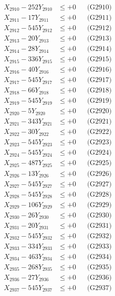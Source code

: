 \documentclass[a4paper,10pt]{article}
\begin{document}
{\begin{align}
X_{2910} - 252Y_{2910} &\leq +0 && \text{(G2910)} \\
\allowbreak
X_{2911} - 17Y_{2911} &\leq +0 && \text{(G2911)} \\
X_{2912} - 545Y_{2912} &\leq +0 && \text{(G2912)} \\
X_{2913} - 20Y_{2913} &\leq +0 && \text{(G2913)} \\
X_{2914} - 28Y_{2914} &\leq +0 && \text{(G2914)} \\
X_{2915} - 336Y_{2915} &\leq +0 && \text{(G2915)} \\
X_{2916} - 40Y_{2916} &\leq +0 && \text{(G2916)} \\
X_{2917} - 545Y_{2917} &\leq +0 && \text{(G2917)} \\
X_{2918} - 66Y_{2918} &\leq +0 && \text{(G2918)} \\
X_{2919} - 545Y_{2919} &\leq +0 && \text{(G2919)} \\
X_{2920} - 5Y_{2920} &\leq +0 && \text{(G2920)} \\
\allowbreak
X_{2921} - 343Y_{2921} &\leq +0 && \text{(G2921)} \\
X_{2922} - 30Y_{2922} &\leq +0 && \text{(G2922)} \\
X_{2923} - 545Y_{2923} &\leq +0 && \text{(G2923)} \\
X_{2924} - 545Y_{2924} &\leq +0 && \text{(G2924)} \\
X_{2925} - 487Y_{2925} &\leq +0 && \text{(G2925)} \\
X_{2926} - 13Y_{2926} &\leq +0 && \text{(G2926)} \\
X_{2927} - 545Y_{2927} &\leq +0 && \text{(G2927)} \\
X_{2928} - 545Y_{2928} &\leq +0 && \text{(G2928)} \\
X_{2929} - 106Y_{2929} &\leq +0 && \text{(G2929)} \\
X_{2930} - 26Y_{2930} &\leq +0 && \text{(G2930)} \\
\allowbreak
X_{2931} - 20Y_{2931} &\leq +0 && \text{(G2931)} \\
X_{2932} - 545Y_{2932} &\leq +0 && \text{(G2932)} \\
X_{2933} - 334Y_{2933} &\leq +0 && \text{(G2933)} \\
X_{2934} - 463Y_{2934} &\leq +0 && \text{(G2934)} \\
X_{2935} - 268Y_{2935} &\leq +0 && \text{(G2935)} \\
X_{2936} - 27Y_{2936} &\leq +0 && \text{(G2936)} \\
X_{2937} - 545Y_{2937} &\leq +0 && \text{(G2937)} \\

\end{align}}
\end{document}

